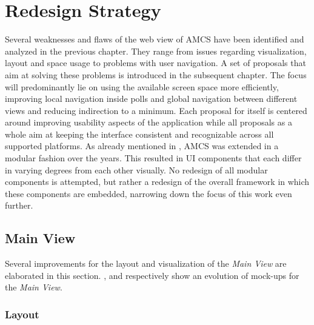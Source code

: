 \chapter{Redesign Strategy}
\label{chapter:redesignstrategy}
Several weaknesses and flaws of the web view of AMCS have been identified and analyzed in the previous chapter. They range from issues regarding visualization, layout and space usage to problems with user navigation.
A set of proposals that aim at solving these problems is introduced in the subsequent chapter. The focus will predominantly lie on using the available screen space more efficiently, improving local navigation inside polls and global navigation between different views and reducing indirection to a minimum. Each proposal for itself is centered around improving usability aspects of the application while all proposals as a whole aim at keeping the interface consistent and recognizable across all supported platforms.
As already mentioned in , AMCS was extended in a modular fashion over the years. This resulted in UI components that each differ in varying degrees from each other visually. 
No redesign of all modular components is attempted, but rather a redesign of the overall framework in which these components are embedded, narrowing down the focus of this work even further.

\section{Main View}

Several improvements for the layout and visualization of the \emph{Main View} are elaborated in this section. ,  and  respectively show an evolution of mock-ups for the \emph{Main View}.
\subsection{Layout}
\label{section:con:proposals:mainview:layout}

